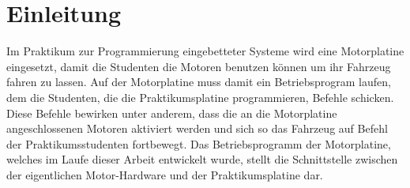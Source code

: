 \chapter{Einleitung}

Im Praktikum zur Programmierung eingebetteter Systeme wird eine Motorplatine \cite{STUD_TIMO}
eingesetzt, damit die Studenten die Motoren benutzen können um ihr Fahrzeug
fahren zu lassen. Auf der Motorplatine muss damit ein Betriebsprogram laufen,
dem die Studenten, die die Praktikumsplatine programmieren, Befehle schicken.
Diese Befehle bewirken unter anderem, dass die an die Motorplatine angeschlossenen
Motoren aktiviert werden und sich so das Fahrzeug auf Befehl der Praktikumsstudenten
fortbewegt. Das Betriebsprogramm der Motorplatine, welches im Laufe dieser Arbeit
entwickelt wurde, stellt die Schnittstelle zwischen der eigentlichen Motor-Hardware
und der Praktikumsplatine dar.
